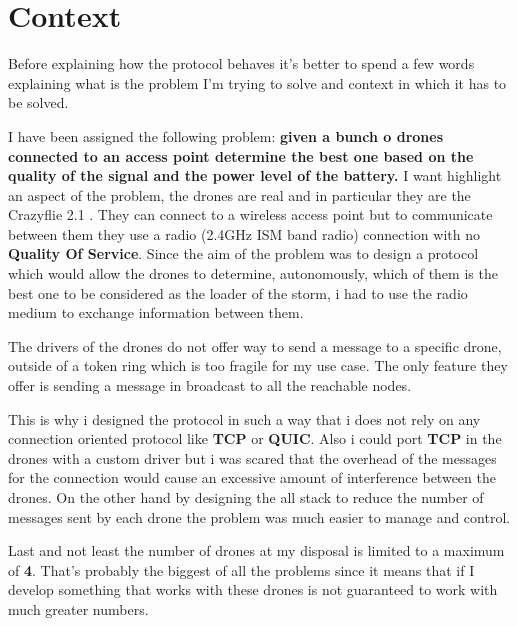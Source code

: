 \section{Context}

Before explaining how the protocol behaves it's better to spend a few words explaining what is the
problem I'm trying to solve and context in which it has to be solved.

I have been assigned the following problem: \textbf
{
  given a bunch o drones connected to an access
  point determine the best one based on the quality of the signal and the power level of the
  battery.
}
I want highlight an aspect of the problem, the drones are real and in particular they are the
Crazyflie 2.1 \cite{1}. They can connect to a wireless access point but to communicate between them
they use a radio (2.4GHz ISM band radio) connection with no \textbf{Quality Of Service}.
Since the aim of the problem was to design a protocol which would allow the drones to determine, 
autonomously, which of them is the best one to be considered as the loader of the storm,
i had to use the radio medium to exchange information between them.

The drivers of the drones do not offer way to send a message to a specific drone, outside of a
token ring which is too fragile for my use case. The only feature they offer is sending a message
in  broadcast to all the reachable nodes. 

This is why i designed the protocol in such a way that i does not rely on any connection oriented
protocol like \textbf{TCP}\cite{2} or \textbf{QUIC}\cite{3}. Also i could port \textbf{TCP}\cite{2}
in the drones with a custom driver but i was scared that the overhead of the messages for the
connection would cause an excessive amount of interference between the drones. On the other hand
by designing the all stack to reduce the number of messages sent by each drone the problem was much
easier to manage and control.

Last and not least the number of drones at my disposal is limited to a maximum of \textbf{4}.
That's probably the biggest of all the problems since it means that if I develop something that
works with these drones is not guaranteed to work with much greater numbers.
